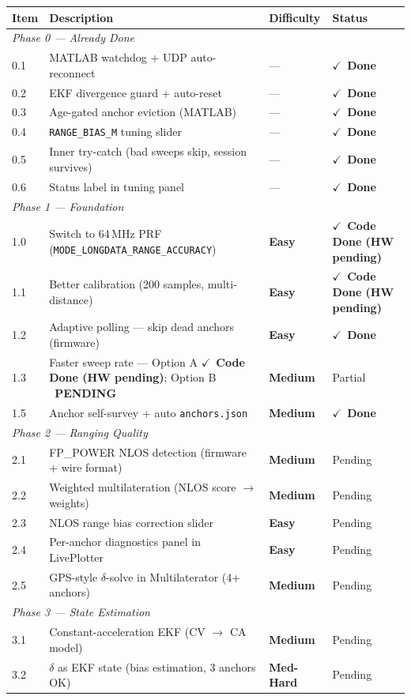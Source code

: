 \documentclass[11pt,a4paper]{article}
\newcommand{\easy}{\textcolor{dkgreen}{\textbf{Easy}}}
\newcommand{\medium}{\textcolor{dkorange}{\textbf{Medium}}}
\newcommand{\medhard}{\textcolor{dkorange}{\textbf{Med-Hard}}}
\newcommand{\done}{\texorpdfstring{\textcolor{dkgreen}{$\checkmark$~\textbf{Done}}}{[Done]}}
\newcommand{\codehwdone}{\texorpdfstring{\textcolor{dkorange}{$\checkmark$~\textbf{Code Done (HW pending)}}}{[Code Done, HW pending]}}
\newcommand{\pendingopt}{\texorpdfstring{\textcolor{dkred}{\faExclamationTriangle~\textbf{PENDING}}}{[PENDING]}}
\begin{document}
\begin{longtable}{llll}
\toprule
\textbf{Item} & \textbf{Description} & \textbf{Difficulty} & \textbf{Status} \\
\midrule
\endhead
\multicolumn{4}{l}{\textit{Phase 0 --- Already Done}} \\
\midrule
0.1 & MATLAB watchdog + UDP auto-reconnect & --- & \done \\
0.2 & EKF divergence guard + auto-reset & --- & \done \\
0.3 & Age-gated anchor eviction (MATLAB) & --- & \done \\
0.4 & \texttt{RANGE\_BIAS\_M} tuning slider & --- & \done \\
0.5 & Inner try-catch (bad sweeps skip, session survives) & --- & \done \\
0.6 & Status label in tuning panel & --- & \done \\
\midrule
\multicolumn{4}{l}{\textit{Phase 1 --- Foundation}} \\
\midrule
1.0 & Switch to 64\,MHz PRF (\texttt{MODE\_LONGDATA\_RANGE\_ACCURACY}) & \easy & \codehwdone \\
1.1 & Better calibration (200 samples, multi-distance) & \easy & \codehwdone \\
1.2 & Adaptive polling --- skip dead anchors (firmware) & \easy & \done \\
1.3 & Faster sweep rate --- Option A \codehwdone; Option B \pendingopt & \medium & Partial \\
1.5 & Anchor self-survey + auto \texttt{anchors.json} & \medium & \done \\
\midrule
\multicolumn{4}{l}{\textit{Phase 2 --- Ranging Quality}} \\
\midrule
2.1 & FP\_POWER NLOS detection (firmware + wire format) & \medium & Pending \\
2.2 & Weighted multilateration (NLOS score $\to$ weights) & \medium & Pending \\
2.3 & NLOS range bias correction slider & \easy & Pending \\
2.4 & Per-anchor diagnostics panel in LivePlotter & \easy & Pending \\
2.5 & GPS-style $\delta$-solve in Multilaterator (4+ anchors) & \medium & Pending \\
\midrule
\multicolumn{4}{l}{\textit{Phase 3 --- State Estimation}} \\
\midrule
3.1 & Constant-acceleration EKF (CV $\to$ CA model) & \medium & Pending \\
3.2 & $\delta$ as EKF state (bias estimation, 3 anchors OK) & \medhard & Pending \\

\end{longtable}
\end{document}
